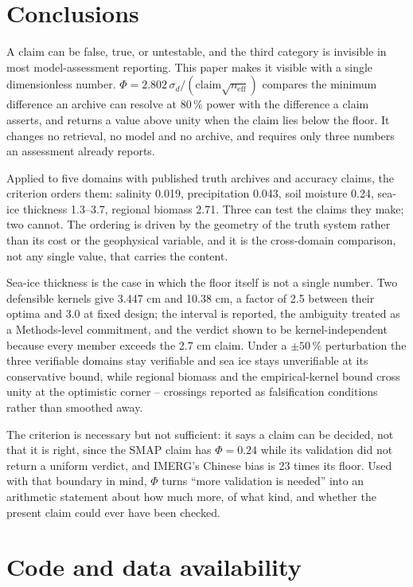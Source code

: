 \documentclass[preprint,12pt,authoryear]{elsarticle}
\begin{document}
\section{Conclusions}

A claim can be false, true, or untestable, and the third category is invisible in most model-assessment reporting. This paper makes it visible with a single dimensionless number. $\Phi = 2.802\,\sigma_d/(\mathrm{claim}\sqrt{n_{\mathrm{eff}}})$ compares the minimum difference an archive can resolve at 80\,\% power with the difference a claim asserts, and returns a value above unity when the claim lies below the floor. It changes no retrieval, no model and no archive, and requires only three numbers an assessment already reports.

Applied to five domains with published truth archives and accuracy claims, the criterion orders them: salinity 0.019, precipitation 0.043, soil moisture 0.24, sea-ice thickness 1.3--3.7, regional biomass 2.71. Three can test the claims they make; two cannot. The ordering is driven by the geometry of the truth system rather than its cost or the geophysical variable, and it is the cross-domain comparison, not any single value, that carries the content.

Sea-ice thickness is the case in which the floor itself is not a single number. Two defensible kernels give 3.447 cm and 10.38 cm, a factor of 2.5 between their optima and 3.0 at fixed design; the interval is reported, the ambiguity treated as a Methods-level commitment, and the verdict shown to be kernel-independent because every member exceeds the 2.7 cm claim. Under a $\pm 50\,\%$ perturbation the three verifiable domains stay verifiable and sea ice stays unverifiable at its conservative bound, while regional biomass and the empirical-kernel bound cross unity at the optimistic corner -- crossings reported as falsification conditions rather than smoothed away.

The criterion is necessary but not sufficient: it says a claim can be decided, not that it is right, since the SMAP claim has $\Phi = 0.24$ while its validation did not return a uniform verdict, and IMERG's Chinese bias is 23 times its floor. Used with that boundary in mind, $\Phi$ turns ``more validation is needed'' into an arithmetic statement about how much more, of what kind, and whether the present claim could ever have been checked.

\section*{Code and data availability}
\end{document}
